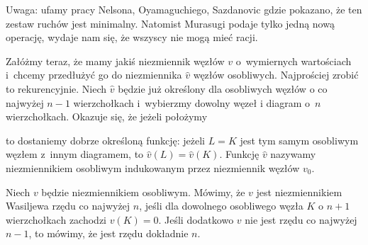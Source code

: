 Uwaga: ufamy pracy Nelsona, Oyamaguchiego, Sazdanovic \cite{sazdanovic19} gdzie pokazano, że ten zestaw ruchów jest minimalny.
%
%
%
Natomist Murasugi podaje tylko jedną nową operację, wydaje nam się, że wszyscy nie mogą mieć racji.

Załóżmy teraz, że mamy jakiś niezmiennik węzłów $v$ o~wymiernych wartościach i~chcemy przedłużyć go do niezmiennika $\hat v$ węzłów osobliwych.
Najprościej zrobić to rekurencyjnie.
Niech $\hat v$ będzie już określony dla osobliwych węzłów o co najwyżej $n - 1$ wierzchołkach i~wybierzmy dowolny węzeł i diagram o~$n$ wierzchołkach.
Okazuje się, że jeżeli położymy

to dostaniemy dobrze określoną funkcję: jeżeli $L = K$ jest tym samym osobliwym węzłem z~innym diagramem, to $\hat v(L) = \hat v(K)$.
Funkcję $\hat v$ nazywamy niezmiennikiem osobliwym indukowanym przez niezmiennik węzłów $v_0$.

\begin{definition}
\label{def:vassiliev_order}%
%
    Niech $v$ będzie niezmiennikiem osobliwym.
    Mówimy, że $v$ jest niezmiennikiem Wasiljewa rzędu co najwyżej $n$, jeśli dla dowolnego osobliwego węzła $K$ o $n + 1$ wierzchołkach zachodzi $v(K) = 0$.
    Jeśli dodatkowo $v$ nie jest rzędu co najwyżej $n - 1$, to mówimy, że jest rzędu dokładnie $n$.
\end{definition}